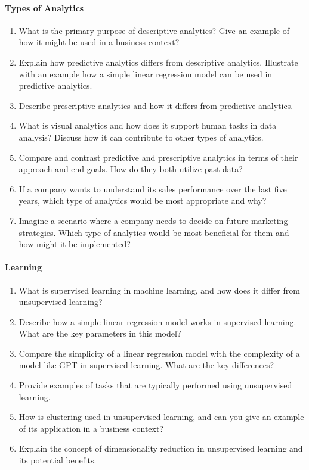 \paragraph*{Types of Analytics}
\begin{enumerate}
	\item What is the primary purpose of descriptive analytics? Give an example of how it might be used in a business context?
	\item Explain how predictive analytics differs from descriptive analytics. Illustrate with an example how a simple linear regression model can be used in predictive analytics.
    \item Describe prescriptive analytics and how it differs from predictive analytics. 
    \item What is visual analytics and how does it support human tasks in data analysis? Discuss how it can contribute to other types of analytics.
    \item Compare and contrast predictive and prescriptive analytics in terms of their approach and end goals. How do they both utilize past data?
    \item If a company wants to understand its sales performance over the last five years, which type of analytics would be most appropriate and why?
    \item Imagine a scenario where a company needs to decide on future marketing strategies. Which type of analytics would be most beneficial for them and how might it be implemented?
\end{enumerate}
\paragraph*{Learning}
\begin{enumerate}
	\item What is supervised learning in machine learning, and how does it differ from unsupervised learning?
	\item Describe how a simple linear regression model works in supervised learning. What are the key parameters in this model?
    \item Compare the simplicity of a linear regression model with the complexity of a model like GPT in supervised learning. What are the key differences?
    \item Provide examples of tasks that are typically performed using unsupervised learning.
	\item How is clustering used in unsupervised learning, and can you give an example of its application in a business context?
	\item Explain the concept of dimensionality reduction in unsupervised learning and its potential benefits.
\end{enumerate}

